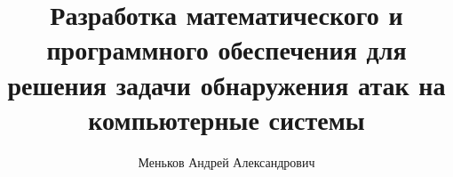 \documentclass[12pt,a4paper]{article}
\author{Меньков Андрей Александрович}
\title{Разработка математического и программного обеспечения для решения задачи обнаружения атак на компьютерные системы}
\begin{document}
\renewcommand{\figurename}{Рисунок}
\renewcommand{\appendixname}{ПРИЛОЖЕНИЕ}





\end{document}
